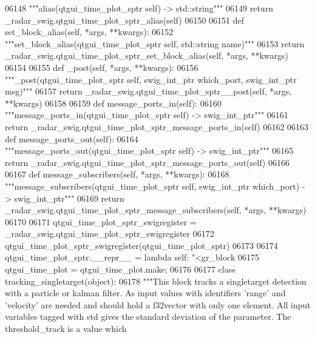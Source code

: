 \begin{DoxyCode}
{{{{{{{{{{{{{{{{{{{{06148         \textcolor{stringliteral}{"""alias(qtgui\_time\_plot\_sptr self) -> std::string"""}
06149         \textcolor{keywordflow}{return} \_radar\_swig.qtgui\_time\_plot\_sptr\_alias(self)
06150 
06151     \textcolor{keyword}{def }set_block_alias(self, *args, **kwargs):
06152         \textcolor{stringliteral}{"""set\_block\_alias(qtgui\_time\_plot\_sptr self, std::string name)"""}
06153         \textcolor{keywordflow}{return} \_radar\_swig.qtgui\_time\_plot\_sptr\_set\_block\_alias(self, *args, **kwargs)
06154 
06155     \textcolor{keyword}{def }_post(self, *args, **kwargs):
06156         \textcolor{stringliteral}{"""\_post(qtgui\_time\_plot\_sptr self, swig\_int\_ptr which\_port, swig\_int\_ptr msg)"""}
06157         \textcolor{keywordflow}{return} \_radar\_swig.qtgui\_time\_plot\_sptr\_\_post(self, *args, **kwargs)
06158 
06159     \textcolor{keyword}{def }message_ports_in(self):
06160         \textcolor{stringliteral}{"""message\_ports\_in(qtgui\_time\_plot\_sptr self) -> swig\_int\_ptr"""}
06161         \textcolor{keywordflow}{return} \_radar\_swig.qtgui\_time\_plot\_sptr\_message\_ports\_in(self)
06162 
06163     \textcolor{keyword}{def }message_ports_out(self):
06164         \textcolor{stringliteral}{"""message\_ports\_out(qtgui\_time\_plot\_sptr self) -> swig\_int\_ptr"""}
06165         \textcolor{keywordflow}{return} \_radar\_swig.qtgui\_time\_plot\_sptr\_message\_ports\_out(self)
06166 
06167     \textcolor{keyword}{def }message_subscribers(self, *args, **kwargs):
06168         \textcolor{stringliteral}{"""message\_subscribers(qtgui\_time\_plot\_sptr self, swig\_int\_ptr which\_port) -> swig\_int\_ptr"""}
06169         \textcolor{keywordflow}{return} \_radar\_swig.qtgui\_time\_plot\_sptr\_message\_subscribers(self, *args, **kwargs)
06170 
06171 qtgui\_time\_plot\_sptr\_swigregister = \_radar\_swig.qtgui\_time\_plot\_sptr\_swigregister
06172 qtgui_time_plot_sptr_swigregister(qtgui\_time\_plot\_sptr)
06173 
06174 qtgui\_time\_plot\_sptr.\_\_repr\_\_ = \textcolor{keyword}{lambda} self: \textcolor{stringliteral}{"<gr\_block %
06175 qtgui\_time\_plot = qtgui\_time\_plot.make;
06176 
06177 \textcolor{keyword}{class }tracking_singletarget(object):
06178     \textcolor{stringliteral}{"""This block tracks a singletarget detection with a particle or kalman filter. As input values with
       identifiers 'range' and 'velocity' are needed and should hold a f32vector with only one element. All input
       variables tagged with std gives the standard deviation of the parameter. The threshold\_track is a value which
}}}}}}}}}}}}}}}}}}}}}}
\end{DoxyCode}
